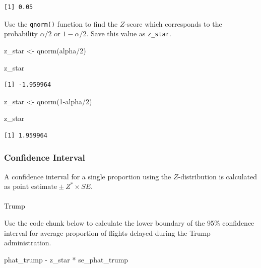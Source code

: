 \documentclass[
  letterpaper,
  DIV=11,
  numbers=noendperiod]{scrartcl}
\makeatletter
\let\oldparagraph\paragraph
\renewcommand{\paragraph}{
    \@ifstar
      \xxxParagraphStar
      \xxxParagraphNoStar
  }
\newcommand{\xxxParagraphStar}[1]{\oldparagraph*{#1}\mbox{}}
\newcommand{\xxxParagraphNoStar}[1]{\oldparagraph{#1}\mbox{}}
\newenvironment{Shaded}{\begin{snugshade}}{\end{snugshade}}
\newcommand{\DecValTok}[1]{\textcolor[rgb]{0.68,0.00,0.00}{#1}}
\newcommand{\FunctionTok}[1]{\textcolor[rgb]{0.28,0.35,0.67}{#1}}
\newcommand{\NormalTok}[1]{\textcolor[rgb]{0.00,0.23,0.31}{#1}}
\newcommand{\OtherTok}[1]{\textcolor[rgb]{0.00,0.23,0.31}{#1}}
\newcommand{\SpecialCharTok}[1]{\textcolor[rgb]{0.37,0.37,0.37}{#1}}
\makeatother
\begin{document}
\begin{verbatim}
[1] 0.05
\end{verbatim}

Use the \texttt{qnorm()} function to find the \(Z\)-score which
corresponds to the probability \(\alpha/2\) or \(1-\alpha/2\). Save this
value as \texttt{z\_star}.

\begin{Shaded}
\begin{Highlighting}[]
\NormalTok{z\_star }\OtherTok{\textless{}{-}} \FunctionTok{qnorm}\NormalTok{(alpha}\SpecialCharTok{/}\DecValTok{2}\NormalTok{)}

\NormalTok{z\_star}
\end{Highlighting}
\end{Shaded}

\begin{verbatim}
[1] -1.959964
\end{verbatim}

\begin{Shaded}
\begin{Highlighting}[]
\NormalTok{z\_star }\OtherTok{\textless{}{-}} \FunctionTok{qnorm}\NormalTok{(}\DecValTok{1}\SpecialCharTok{{-}}\NormalTok{alpha}\SpecialCharTok{/}\DecValTok{2}\NormalTok{)}

\NormalTok{z\_star}
\end{Highlighting}
\end{Shaded}

\begin{verbatim}
[1] 1.959964
\end{verbatim}

\subsubsection{Confidence Interval}\label{confidence-interval}

A confidence interval for a single proportion using the
\(Z\)-distribution is calculated as
\(\text{point estimate} \pm Z^* \times SE\).

\paragraph{Trump}\label{trump}

Use the code chunk below to calculate the lower boundary of the 95\%
confidence interval for average proportion of flights delayed during the
Trump administration.

\begin{Shaded}
\begin{Highlighting}[]
\NormalTok{phat\_trump }\SpecialCharTok{{-}}\NormalTok{ z\_star }\SpecialCharTok{*}\NormalTok{ se\_phat\_trump}
\end{Highlighting}
\end{Shaded}
\end{document}
